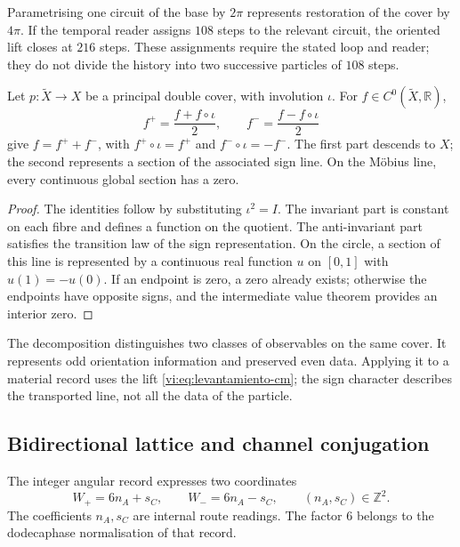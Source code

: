 Parametrising one circuit of the base by $2\pi$
represents restoration of the cover by $4\pi$. If the
temporal reader assigns $108$ steps to the relevant circuit, the
oriented lift closes at $216$ steps. These assignments
require the stated loop and reader; they do not divide the history into
two successive particles of $108$ steps.

\begin{proposition}
\label{vi:prop:observables-paridad}
Let $p:\widetilde X\to X$ be a principal double cover, with
involution $\iota$. For $f\in C^0(\widetilde X,\mathbb R)$,
\[
 f^+=\frac{f+f\circ\iota}{2},\qquad
 f^-=\frac{f-f\circ\iota}{2}
\]
give $f=f^++f^-$, with $f^+\circ\iota=f^+$ and
$f^-\circ\iota=-f^-$. The first part descends to $X$; the
second represents a section of the associated sign line. On
the Möbius line, every continuous global section has a zero.
\end{proposition}
\begin{proof}
The identities follow by substituting $\iota^2=I$. The invariant
part is constant on each fibre and defines a function on the
quotient. The anti-invariant part satisfies the transition law
of the sign representation. On the circle, a section of this
line is represented by a continuous real function $u$ on $[0,1]$
with $u(1)=-u(0)$. If an endpoint is zero, a zero already exists; otherwise
the endpoints have opposite signs, and the intermediate value
theorem provides an interior zero.
\end{proof}

The decomposition distinguishes two classes of observables on the
same cover. It represents odd orientation information
and preserved even data. Applying it to a material record uses
the lift \eqref{vi:eq:levantamiento-cm}; the sign character
describes the transported line, not all the data of the
particle.

\subsection{Bidirectional lattice and channel conjugation}
\label{vi:subsec:reticulo-bidireccional}

The integer angular record expresses two coordinates
\begin{equation}
 W_+=6n_A+s_C,\qquad W_-=6n_A-s_C,
 \qquad (n_A,s_C)\in\mathbb Z^2.
 \label{vi:eq:reticulo-ida-retorno}
\end{equation}
The coefficients $n_A,s_C$ are internal route readings. The factor
$6$ belongs to the dodecaphase normalisation of that record.

